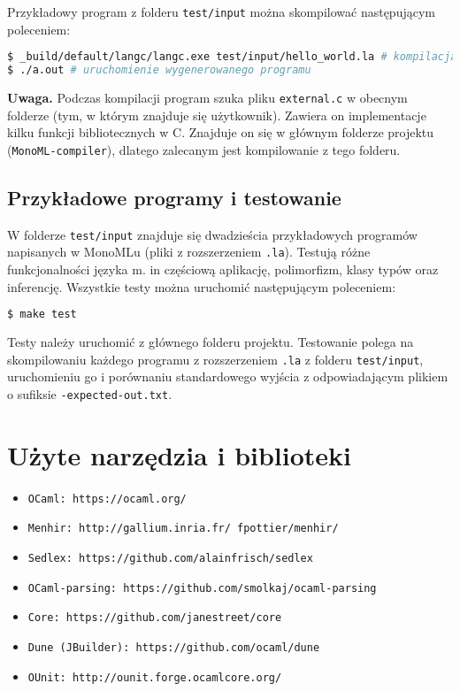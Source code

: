 \documentclass[declaration,shortabstract]{iithesis}
\begin{document}
Przykładowy program z folderu \texttt{test/input} można skompilować następującym 
poleceniem: 
\begin{lstlisting}[language=bash]
$ _build/default/langc/langc.exe test/input/hello_world.la # kompilacja 
$ ./a.out # uruchomienie wygenerowanego programu 
\end{lstlisting}

\textbf{Uwaga.} Podczas kompilacji program szuka pliku \texttt{external.c} w 
obecnym folderze (tym, w którym znajduje się użytkownik). Zawiera on  
implementacje kilku funkcji bibliotecznych w C. Znajduje on się w 
głównym folderze projektu (\texttt{MonoML-compiler}), dlatego zalecanym jest 
kompilowanie z tego folderu.

\subsection{Przykładowe programy i testowanie}

W folderze \texttt{test/input} znajduje się dwadzieścia przykładowych programów
napisanych w MonoMLu (pliki z rozszerzeniem \texttt{.la}). Testują różne funkcjonalności języka m. in 
częściową aplikację, polimorfizm, klasy typów oraz inferencję. 
Wszystkie testy można uruchomić następującym poleceniem:
\begin{lstlisting}[language=bash]
$ make test
\end{lstlisting}
Testy należy uruchomić z głównego folderu projektu.
Testowanie polega na skompilowaniu każdego programu z rozszerzeniem \texttt{.la}
z folderu \texttt{test/input}, uruchomieniu go i porównaniu standardowego 
wyjścia z odpowiadającym plikiem o sufiksie \texttt{-expected-out.txt}.

\section{Użyte narzędzia i biblioteki}

\begin{itemize}
  \item \texttt{OCaml: https://ocaml.org/}
  \item \texttt{Menhir: http://gallium.inria.fr/~fpottier/menhir/}
  \item \texttt{Sedlex: https://github.com/alainfrisch/sedlex}
  \item \texttt{OCaml-parsing: https://github.com/smolkaj/ocaml-parsing}
  \item \texttt{Core: https://github.com/janestreet/core} 
  \item \texttt{Dune (JBuilder): https://github.com/ocaml/dune} 
  \item \texttt{OUnit: http://ounit.forge.ocamlcore.org/} 
\end{itemize}
\end{document}

